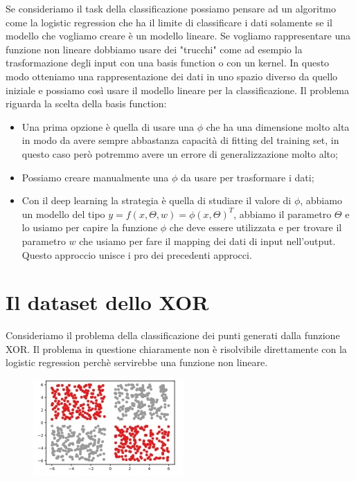 \documentclass[14pt]{extreport}
\begin{document}
Se consideriamo il task della classificazione possiamo pensare ad un algoritmo come la logistic regression che ha il limite di classificare i dati
solamente se il modello che vogliamo creare è un modello lineare. Se vogliamo rappresentare una funzione non lineare dobbiamo usare dei "trucchi" come
ad esempio la trasformazione degli input con una basis function o con un kernel. In questo modo otteniamo una rappresentazione dei dati in uno spazio
diverso da quello iniziale e possiamo così usare il modello lineare per la classificazione. Il problema riguarda la scelta della basis function:
\begin{itemize}
\item Una prima opzione è quella di usare una $\phi$ che ha una dimensione molto alta in modo da avere sempre abbastanza capacità di fitting del
training set, in questo caso però potremmo avere un errore di generalizzazione molto alto;
\item Possiamo creare manualmente una $\phi$ da usare per trasformare i dati;
\item Con il deep learning la strategia è quella di studiare il valore di $\phi$, abbiamo un modello del tipo $y = f(x, \Theta, w) = \phi(x,
\Theta)^T$, abbiamo il parametro $\Theta$ e lo usiamo per capire la funzione $\phi$ che deve essere utilizzata e per trovare il parametro $w$ che
usiamo per fare il mapping dei dati di input nell'output. Questo approccio unisce i pro dei precedenti approcci.
\end{itemize}


\section{Il dataset dello XOR}

Consideriamo il problema della classificazione dei punti generati dalla funzione XOR. Il problema in questione chiaramente non è risolvibile
direttamente con la logistic regression perchè servirebbe una funzione non lineare.

\begin{figure}[H]
\centering
\includegraphics[width=0.7\linewidth]{355.jpeg}
\end{figure}
\end{document}

